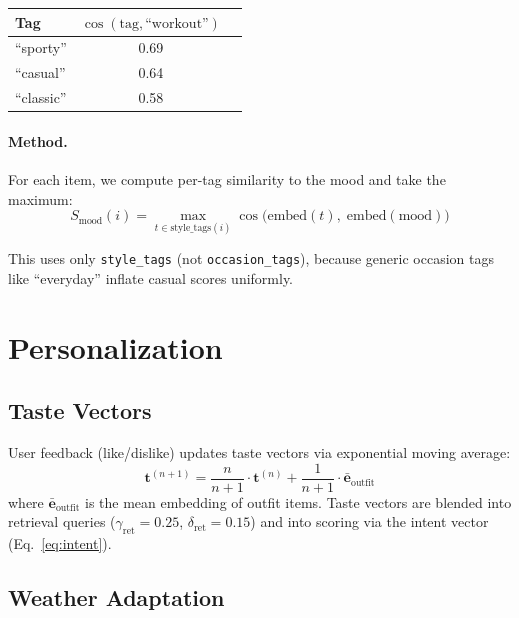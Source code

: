 \documentclass[10pt,twocolumn]{article}
\begin{document}
\vspace{4pt}
\begin{center}
\small
\begin{tabular}{lcc}
\toprule
Tag & $\cos(\text{tag}, \text{``workout''})$ \\
\midrule
``sporty'' & 0.69 \\
``casual'' & 0.64 \\
``classic'' & 0.58 \\
\bottomrule
\end{tabular}
\end{center}
\vspace{4pt}

\paragraph{Method.}
For each item, we compute per-tag similarity to the mood and take the
maximum:
\begin{equation}
  S_{\text{mood}}(i) = \max_{t \in \text{style\_tags}(i)}
    \cos\!\big(\text{embed}(t),\; \text{embed}(\text{mood})\big)
\end{equation}

This uses only \texttt{style\_tags} (not \texttt{occasion\_tags}), because
generic occasion tags like ``everyday'' inflate casual scores uniformly.

\section{Personalization}
\label{sec:personal}

\subsection{Taste Vectors}

User feedback (like/dislike) updates taste vectors via exponential moving
average:
\begin{equation}
  \mathbf{t}^{(n+1)} = \frac{n}{n+1} \cdot \mathbf{t}^{(n)}
    + \frac{1}{n+1} \cdot \bar{\mathbf{e}}_{\text{outfit}}
\end{equation}
where $\bar{\mathbf{e}}_{\text{outfit}}$ is the mean embedding of outfit
items.  Taste vectors are blended into retrieval queries ($\gamma_{\text{ret}}
= 0.25$, $\delta_{\text{ret}} = 0.15$) and into scoring via the intent
vector (Eq.~\ref{eq:intent}).

\subsection{Weather Adaptation}
\end{document}
